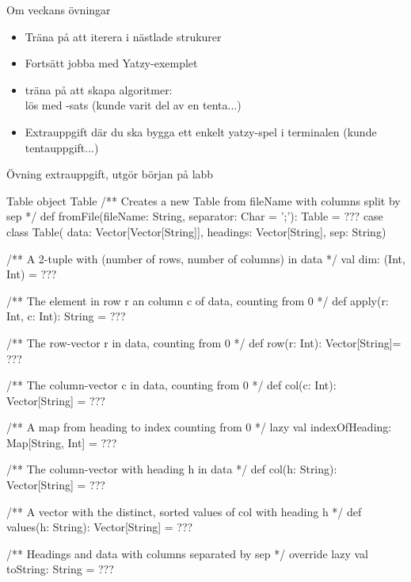 \begin{Slide}{Om veckans övningar}\SlideFontSmall
\begin{itemize}
\item Träna på att iterera i nästlade strukurer

\item Fortsätt jobba med Yatzy-exemplet

\item träna på att skapa  algoritmer: \\
lös  med -sats (kunde varit del av en tenta...)

\item Extrauppgift där du ska bygga ett enkelt yatzy-spel i terminalen (kunde tentauppgift...)

\end{itemize}
\end{Slide}

\begin{Slide}{Övning extrauppgift, utgör början på labb }\SlideFontSmall

\begin{ScalaSpec}{Table}
object Table {
  /** Creates a new Table from fileName with columns split by sep */
  def fromFile(fileName: String, separator: Char = ';'): Table = ???
}
case class Table(
  data: Vector[Vector[String]],
  headings: Vector[String],
  sep: String){
  /** A 2-tuple with (number of rows, number of columns) in data */
  val dim: (Int, Int) = ???

  /** The element in row r an column c of data, counting from 0 */
  def apply(r: Int, c: Int): String = ???

  /** The row-vector r in data, counting from 0 */
  def row(r: Int): Vector[String]= ???

  /** The column-vector c in data, counting from 0 */
  def col(c: Int): Vector[String] = ???

  /** A map from heading to index counting from 0 */
  lazy val indexOfHeading: Map[String, Int] = ???

  /** The column-vector with heading h in data */
  def col(h: String): Vector[String] = ???

  /** A vector with the distinct, sorted values of col with heading h */
  def values(h: String): Vector[String] = ???

  /** Headings and data with columns separated by sep */
  override lazy val toString: String = ???
}
\end{ScalaSpec}
\end{Slide}


